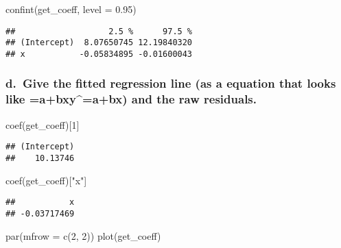 \documentclass[
]{article}
\newenvironment{Shaded}{\begin{snugshade}}{\end{snugshade}}
\newcommand{\AttributeTok}[1]{\textcolor[rgb]{0.77,0.63,0.00}{#1}}
\newcommand{\DecValTok}[1]{\textcolor[rgb]{0.00,0.00,0.81}{#1}}
\newcommand{\FloatTok}[1]{\textcolor[rgb]{0.00,0.00,0.81}{#1}}
\newcommand{\FunctionTok}[1]{\textcolor[rgb]{0.00,0.00,0.00}{#1}}
\newcommand{\NormalTok}[1]{#1}
\newcommand{\StringTok}[1]{\textcolor[rgb]{0.31,0.60,0.02}{#1}}
\begin{document}
\begin{Shaded}
\begin{Highlighting}[]
\FunctionTok{confint}\NormalTok{(get\_coeff, }\AttributeTok{level =} \FloatTok{0.95}\NormalTok{)}
\end{Highlighting}
\end{Shaded}

\begin{verbatim}
##                   2.5 %      97.5 %
## (Intercept)  8.07650745 12.19840320
## x           -0.05834895 -0.01600043
\end{verbatim}

\hypertarget{d.-give-the-fitted-regression-line-as-a-equation-that-looks-like-abxyabx-and-the-raw-residuals.}{%
\subsubsection{\texorpdfstring{d.~Give the fitted regression line (as a
equation that looks like =a+bxy\^{}=a+bx) and the raw
residuals.}{d.~Give the fitted regression line (as a equation that looks like =a+bxy\^{}=a+bx) and the raw residuals.}}\label{d.-give-the-fitted-regression-line-as-a-equation-that-looks-like-abxyabx-and-the-raw-residuals.}}

\begin{Shaded}
\begin{Highlighting}[]
\FunctionTok{coef}\NormalTok{(get\_coeff)[}\DecValTok{1}\NormalTok{]}
\end{Highlighting}
\end{Shaded}

\begin{verbatim}
## (Intercept) 
##    10.13746
\end{verbatim}

\begin{Shaded}
\begin{Highlighting}[]
\FunctionTok{coef}\NormalTok{(get\_coeff)[}\StringTok{"x"}\NormalTok{]}
\end{Highlighting}
\end{Shaded}

\begin{verbatim}
##           x 
## -0.03717469
\end{verbatim}

\begin{Shaded}
\begin{Highlighting}[]
\FunctionTok{par}\NormalTok{(}\AttributeTok{mfrow =} \FunctionTok{c}\NormalTok{(}\DecValTok{2}\NormalTok{, }\DecValTok{2}\NormalTok{))}
\FunctionTok{plot}\NormalTok{(get\_coeff)}
\end{Highlighting}
\end{Shaded}
\end{document}
